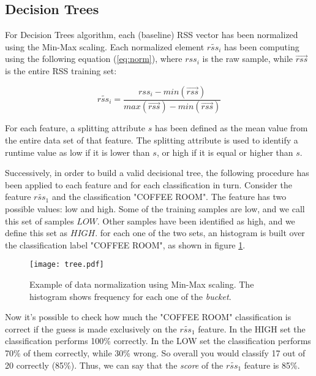 
\subsection{Decision Trees}
\label{subsec:trees}
For Decision Trees algorithm, each (baseline) RSS vector has been normalized using the Min-Max scaling. Each normalized element $\widetilde{rss_i}$ has been computing using the following equation (\ref{eq:norm}), where $rss_i$ is the raw sample, while $\vec{rss}$ is the entire RSS training set:

\begin{equation}\label{eq:norm}
\widetilde{rss_i} = \frac{rss_i - min(\vec{rss})}{max(\vec{rss}) - min(\vec{rss})}
\end{equation}

For each feature, a splitting attribute $s$ has been defined as the mean value from the entire data set of that feature. The splitting attribute is used to identify a runtime value as low if it is lower than $s$, or high if it is equal or higher than $s$.

Successively, in order to build a valid decisional tree, the following procedure has been applied to each feature and for each classification in turn. Consider the feature $\widetilde{rss_1}$ and the classification "COFFEE ROOM". The feature has two possible values: low and high. Some of the training samples are low, and we call this set of samples $LOW$. Other samples have been identified as high, and we define this set as $HIGH$. for each one of the two sets, an histogram is built over the classification label "COFFEE ROOM", as shown in figure \ref{fig:tree}.

\begin{figure}[h!tb]
\centering
\texttt{[image: tree.pdf]}
\caption[Example of data normalization using Min-Max scaling.]{Example of data normalization using Min-Max scaling. The histogram shows frequency for each one of the \emph{bucket}.}
\label{fig:tree}
\end{figure}

 Now it's possible to check how much the "COFFEE ROOM" classification is correct if the guess is made exclusively on the $\widetilde{rss_1}$ feature.
In the HIGH set the classification performs 100\% correctly. In the LOW set the classification performs 70\% of them correctly, while 30\% wrong. So overall you would classify 17 out of 20 correctly (85\%). Thus, we can say that the \emph{score} of the $\widetilde{rss_1}$ feature is 85\%. 

